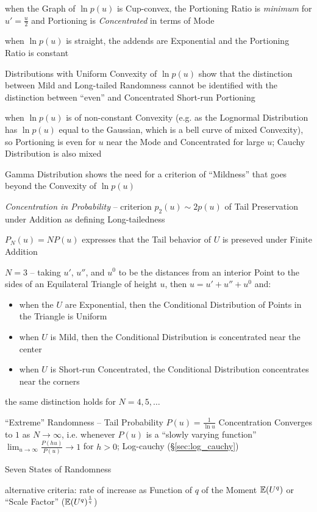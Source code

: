 when the Graph of $\ln p(u)$ is Cup-convex, the Portioning Ratio is
\emph{minimum} for $u' = \frac{u}{2}$ and Portioning is \emph{Concentrated} in
terms of Mode

when $\ln p(u)$ is straight, the addends are Exponential and the Portioning
Ratio is constant

Distributions with Uniform Convexity of $\ln p(u)$ show that the distinction
between Mild and Long-tailed Randomness cannot be identified with the
distinction between ``even'' and Concentrated Short-run Portioning

when $\ln p(u)$ is of non-constant Convexity (e.g. as the Lognormal Distribution
has $\ln p(u)$ equal to the Gaussian, which is a bell curve of mixed Convexity),
so Portioning is even for $u$ near the Mode and Concentrated for large $u$;
Cauchy Distribution is also mixed

\fist Gamma Distribution shows the need for a criterion of ``Mildness'' that
goes beyond the Convexity of $\ln p(u)$

\emph{Concentration in Probability} -- criterion $p_2(u) \sim 2p(u)$ of Tail
Preservation under Addition as defining Long-tailedness

$P_N(u) = NP(u)$ expresses that the Tail behavior of $U$ is preseved under
Finite Addition

$N = 3$ -- taking $u'$, $u''$, and $u^0$ to be the distances from an interior
Point to the sides of an Equilateral Triangle of height $u$, then $u = u' + u''
+ u^0$ and:
\begin{itemize}
  \item when the $U$ are Exponential, then the Conditional Distribution of
    Points in the Triangle is Uniform
  \item when $U$ is Mild, then the Conditional Distribution is concentrated near
    the center
  \item when $U$ is Short-run Concentrated, the Conditional Distribution
    concentrates near the corners
\end{itemize}
the same distinction holds for $N = 4, 5, \ldots$

``Extreme'' Randomness -- Tail Probability $P(u) = \frac{1}{\ln u}$
Concentration Converges to $1$ as $N \to \infty$, i.e. whenever $P(u)$ is a
``slowly varying function'' $\lim_{u\to\infty}\frac{P(hu)}{P(u)} \to 1$ for
$h > 0$; Log-cauchy (\S\ref{sec:log_cauchy})

Seven States of Randomness

alternative criteria: rate of increase as Function of $q$ of the Moment
$\mathbb{E}(U^q)$ or ``Scale Factor'' ($\mathbb{E}(U^q)^\frac{1}{q}$)

